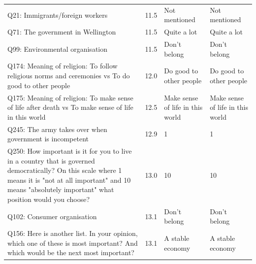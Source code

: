 \begin{tabular}{p{3.1in}lp{1.05in}p{1.05in}}
Q21: Immigrants/foreign workers & 11.5 & Not mentioned & Not mentioned \\
Q71: The government in Wellington & 11.5 & Quite a lot & Quite a lot \\
Q99: Environmental organisation & 11.5 & Don't belong & Don't belong \\
Q174: Meaning of religion: To follow religious norms and ceremonies vs To do good to other people & 12.0 & Do good to other people & Do good to other people \\
Q175: Meaning of religion: To make sense of life after death vs To make sense of life in this world & 12.5 & Make sense of life in this world & Make sense of life in this world \\
Q245: The army takes over when government is incompetent & 12.9 & 1 & 1 \\
Q250: How important is it for you to live in a country that is governed democratically? On this scale where 1 means it is "not at all important" and 10 means "absolutely important" what position would you choose? & 13.0 & 10 & 10 \\
Q102: Consumer organisation & 13.1 & Don't belong & Don't belong \\
Q156: Here is another list. In your opinion, which one of these is most important? And which would be the next most important? & 13.1 & A stable economy & A stable economy \\
\bottomrule
\end{tabular}
